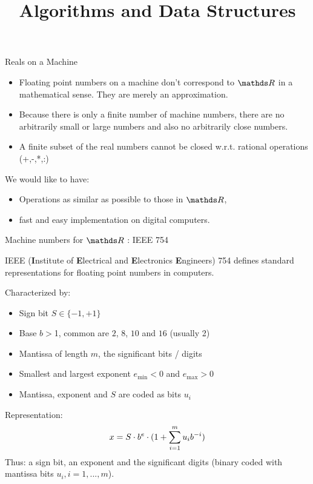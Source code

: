 \documentclass[11pt,compress,t,notes=noshow, xcolor=table]{beamer}
\title{Algorithms and Data Structures}
\begin{document}




\begin{vbframe}{Reals on a Machine}
\begin{itemize}
\item Floating point numbers on a machine don't correspond to $\R$ in a mathematical sense.
  They are merely an approximation.
\item Because there is only a finite number of machine numbers,
  there are no arbitrarily small or large numbers and also no arbitrarily close numbers.
\item A finite subset of the real numbers cannot be closed w.r.t. rational operations (+,-,*,:) %
\end{itemize}

\lz

We would like to have:
\begin{itemize}
  \item Operations as similar as possible to those in $\R$,
  \item fast and easy implementation on digital computers.
\end{itemize}
\end{vbframe}


\begin{vbframe}{Machine numbers for $\R$ : IEEE 754}

IEEE (\textbf{I}nstitute of \textbf{E}lectrical and \textbf{E}lectronics \textbf{E}ngineers) 754 defines standard representations for floating point numbers in computers.

\lz

Characterized by:
\begin{itemize}
\item Sign bit $S\in\{-1, +1\}$
\item Base $b>$1, common are $2$, $8$, $10$ and $16$ (usually 2)
\item Mantissa of length $m$, the significant bits / digits
\item Smallest and largest exponent $e_{\min}<0$ and $e_{\max}>0$
\item Mantissa, exponent and $S$ are coded as bits $u_i$
\end{itemize}

\lz

Representation:
$$
x = S \cdot b^e \cdot (1 + \sumim u_{i} b^{-i}) %
$$
Thus: a sign bit, an exponent and the significant digits (binary coded with mantissa bits $u_i, i = 1,..., m$).
\end{vbframe}
\end{document}
